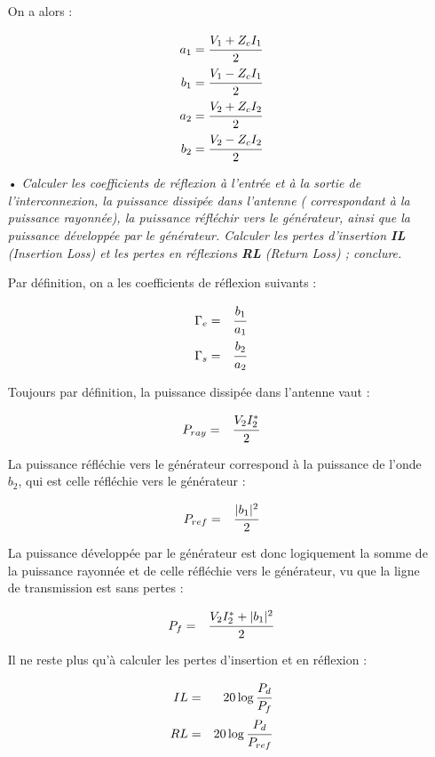 \documentclass[11pt;a4paper;fleqn]{report}
\begin{document}
\begin{itemize}
     On a alors :
     
     \begin{eqnarray}
      a_1 = \cfrac{ V_1 + Z_c I_1}{2} \\
      b_1 = \cfrac{ V_1 - Z_c I_1}{2} \\
      a_2 = \cfrac{ V_2 + Z_c I_2}{2} \\
      b_2 = \cfrac{ V_2 - Z_c I_2}{2}
     \end{eqnarray}

    \item[•] \textit{Calculer les coefficients de réflexion à l'entrée et à la sortie de l'interconnexion, la puissance dissipée dans l'antenne ( correspondant à la puissance rayonnée), la puissance réfléchir vers le générateur, ainsi que la puissance développée par le générateur. Calculer les pertes d'insertion \textbf{IL} (\emph{Insertion Loss}) et les pertes en réflexions \textbf{RL} (\emph{Return Loss}) ; conclure.}
     
     Par définition, on a les coefficients de réflexion suivants :

     \begin{eqnarray}
      \Gamma_e &=& \cfrac{b_1}{a_1} \\
      \Gamma_s &=& \cfrac{b_2}{a_2}
     \end{eqnarray}

     Toujours par définition, la puissance dissipée dans l'antenne vaut :

     \begin{eqnarray}
      P_{ray} &=& \cfrac{V_2 I_2^*}{2}
     \end{eqnarray}

     La puissance réfléchie vers le générateur correspond à la puissance de l'onde $b_2$, qui est celle réfléchie vers le générateur :

     \begin{eqnarray}
      P_{ref} &=& \cfrac{|b_1|^2}{2}
     \end{eqnarray}

     La puissance développée par le générateur est donc logiquement la somme de la puissance rayonnée et de celle réfléchie vers le générateur, vu que la ligne de transmission est sans pertes :

     \begin{eqnarray}
      P_f &=&  \cfrac{V_2 I_2^* + |b_1|^2}{2}
     \end{eqnarray}

     Il ne reste plus qu'à calculer les pertes d'insertion et en réflexion :

     \begin{eqnarray}
      IL &=& 20 \log \cfrac{P_d}{P_f} \\
      RL &=& 20 \log \cfrac{P_d}{P_{ref}}
     \end{eqnarray}

   \end{itemize}
\end{document}
